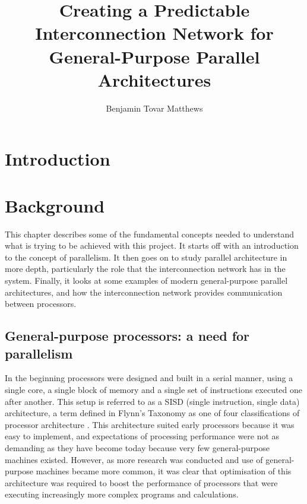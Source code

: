 \documentclass[a4paper, 12pt]{article}
\title{Creating a Predictable Interconnection Network for General-Purpose Parallel Architectures}
\author{Benjamin Tovar Matthews}
\begin{document}
\maketitle

\begin{abstract}

\end{abstract}

\thispagestyle{empty}
\newpage
{}
\tableofcontents
\newpage
\listoffigures

\newpage
\section{Introduction}



\newpage
\section{Background}

This chapter describes some of the fundamental concepts needed to understand what is trying to be achieved with this project. It starts off with an introduction to the concept of parallelism. It then goes on to study parallel architecture in more depth, particularly the role that the interconnection network has in the system. Finally, it looks at some examples of modern general-purpose parallel architectures, and how the interconnection network provides communication between processors.

\subsection{General-purpose processors: a need for parallelism}

In the beginning processors were designed and built in a serial manner, using a single core, a single block of memory and a single set of instructions executed one after another. This setup is referred to as a SISD (single instruction, single data) architecture, a term defined in Flynn's Taxonomy as one of four classifications of processor architecture \cite{Fly72}. This architecture suited early processors because it was easy to implement, and expectations of processing performance were not as demanding as they have become today because very few general-purpose machines existed. However, as more research was conducted and use of general-purpose machines became more common, it was clear that optimisation of this architecture was required to boost the performance of processors that were executing increasingly more complex programs and calculations. 
\end{document}
